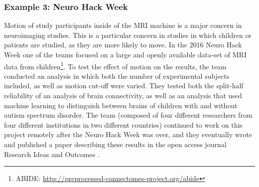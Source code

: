\subsubsection*{Example 3: Neuro Hack Week}
Motion of study participants inside of the MRI machine is a major concern in neuroimaging studies.
This is a particular concern in studies in which children or patients are studied, as they are more likely to move.
In the 2016 Neuro Hack Week one of the teams focused on a large and openly available data-set of MRI data from children\footnote{ABIDE: \url{http://preprocessed-connectomes-project.org/abide}}.
To test the effect of motion on the results, the team conducted an analysis in which both the number of experimental subjects included, as well as motion cut-off were varied.
They tested both the split-half reliability of an analysis of brain connectivity, as well as an analysis that used machine learning to distinguish between brains of children with and without autism spectrum disorder.
The team (composed of four different researchers from four different institutions in two different countries) continued to work on this project remotely after the Neuro Hack Week was over, and they eventually wrote and published a paper describing these results in the open access journal Research Ideas and Outcomes \cite{leonard2017}.
